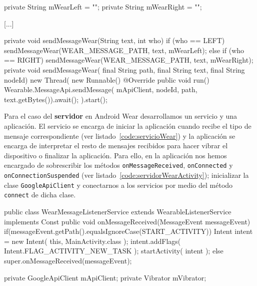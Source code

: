 \begin{definitionlist}
\begin{listing}[
  language = java,
  caption  = {Métodos utilizados para enviar mensajes por bluetooth haciendo uso de los Play
               Services},
  label    = code:sendMessageWear]
private String mWearLeft = "";
private String mWearRight = "";

[...]

private void sendMessageWear(String text, int who) {
    if (who == LEFT) {
        sendMessageWear(WEAR_MESSAGE_PATH, text, mWearLeft);
    }else if (who == RIGHT) {
        sendMessageWear(WEAR_MESSAGE_PATH, text, mWearRight);
    }
}
private void sendMessageWear( final String path, final String text, final String nodeId) {
    new Thread( new Runnable() {
        @Override
        public void run() {
            Wearable.MessageApi.sendMessage(
              mApiClient, nodeId, path, text.getBytes()).await();
        }
    }).start();
}
\end{listing}

    Para el caso del \textbf{servidor} en Android Wear desarrollamos un servicio y una
    aplicación. El servicio se encarga de iniciar la aplicación cuando recibe el tipo de mensaje
    correspondiente (ver listado~\ref{code:servicioWear}) y la aplicación se encarga de interpretar
    el resto de mensajes recibidos para hacer vibrar el dispositivo o finalizar la aplicación. Para
    ello, en la aplicación nos hemos encargado de sobrescribir los métodos
    \texttt{onMessageReceived}, \texttt{onConnected} y \texttt{onConnectionSuspended} (ver
    listado~\ref{code:servidorWearActivity}); inicializar la clase \texttt{GoogleApiClient} y
    conectarnos a los servicios por medio del método \texttt{connect} de dicha clase.

\begin{listing}[
  language = java,
  caption  = {Servicio que inicia la aplicación en el wearable},
  label    = code:servicioWear]
public class WearMessageListenerService extends WearableListenerService implements Const{
  public void onMessageReceived(MessageEvent messageEvent) {
    if(messageEvent.getPath().equalsIgnoreCase(START_ACTIVITY)) {
      Intent intent = new Intent( this, MainActivity.class );
      intent.addFlags( Intent.FLAG_ACTIVITY_NEW_TASK );
      startActivity( intent );
    } else {
      super.onMessageReceived(messageEvent);
    }
  }
}
\end{listing}

\newpage
\begin{listing}[
  language = java,
  caption  = {Métodos utilizados en los servidores para leer los mensajes recibidos por medio de los
              Play Services },
  label    = code:servidorWearActivity]
private GoogleApiClient mApiClient;
private Vibrator mVibrator;
    

\end{listing}
\end{definitionlist}
